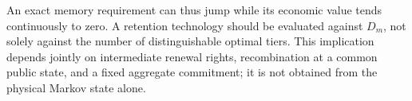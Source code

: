 An exact memory requirement can thus jump while its economic value tends continuously to zero. A retention technology should be evaluated against $D_m$, not solely against the number of distinguishable optimal tiers. This implication depends jointly on intermediate renewal rights, recombination at a common public state, and a fixed aggregate commitment; it is not obtained from the physical Markov state alone.
